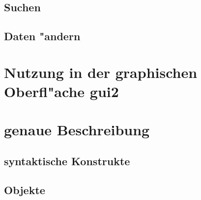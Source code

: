 \subsection{Suchen}
\label{subsec:quickstart:search}

\subsection{Daten "andern}
\label{subsec:quickstart:edit}

\section{Nutzung in der graphischen Oberfl"ache gui2}
\label{sec:use_in_gui2}

\section{genaue Beschreibung}
\label{sec:spec}

\subsection{syntaktische Konstrukte}
\label{subsec:spec:syntax}

\subsection{Objekte}
\label{subsec:spec:objects}


